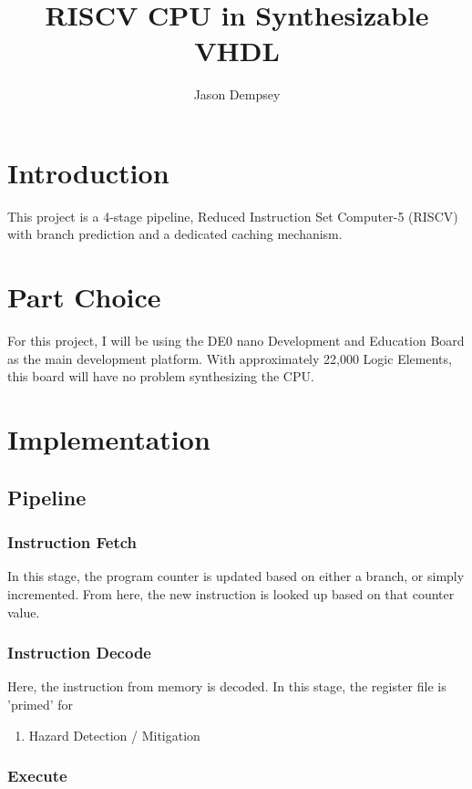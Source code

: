 \documentclass[11pt]{article}
\author{Jason Dempsey}
\date{}
\title{RISCV CPU in Synthesizable VHDL}
\begin{document}
\maketitle
\tableofcontents



\section{Introduction}
\label{sec-1}
This project is a 4-stage pipeline, Reduced Instruction Set Computer-5 (RISCV) with branch prediction and a dedicated caching mechanism. 

\section{Part Choice}
\label{sec-2}
For this project, I will be using the DE0 nano Development and Education Board as the main development platform. With approximately 22,000 Logic Elements, this board will have no problem synthesizing the CPU.

\section{Implementation}
\label{sec-3}



\subsection{Pipeline}
\label{sec-3-1}

\subsubsection{Instruction Fetch}
\label{sec-3-1-1}
In this stage, the program counter is updated based on either a branch, or simply incremented. From here, the new instruction is looked up based on that counter value.
\subsubsection{Instruction Decode}
\label{sec-3-1-2}
Here, the instruction from memory is decoded. In this stage, the register file is 'primed' for 
\begin{enumerate}
\item Hazard Detection / Mitigation
\label{sec-3-1-2-1}
\end{enumerate}

\subsubsection{Execute}
\label{sec-3-1-3}
\end{document}
